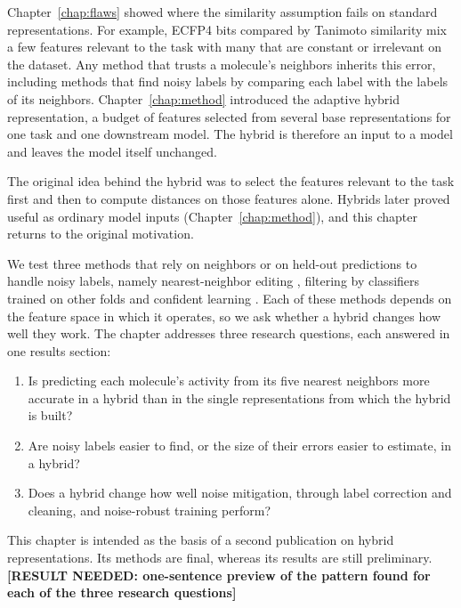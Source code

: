 Chapter~\ref{chap:flaws} showed where the similarity assumption fails on standard representations. For example, ECFP4 bits compared by Tanimoto similarity mix a few features relevant to the task with many that are constant or irrelevant on the dataset. Any method that trusts a molecule's neighbors inherits this error, including methods that find noisy labels by comparing each label with the labels of its neighbors. Chapter~\ref{chap:method} introduced the adaptive hybrid representation, a budget of features selected from several base representations for one task and one downstream model. The hybrid is therefore an input to a model and leaves the model itself unchanged.

The original idea behind the hybrid was to select the features relevant to the task first and then to compute distances on those features alone. Hybrids later proved useful as ordinary model inputs (Chapter~\ref{chap:method}), and this chapter returns to the original motivation.

We test three methods that rely on neighbors or on held-out predictions to handle noisy labels, namely nearest-neighbor editing \citep{Wilson1972}, filtering by classifiers trained on other folds \citep{Brodley1999} and confident learning \citep{Northcutt2021}. Each of these methods depends on the feature space in which it operates, so we ask whether a hybrid changes how well they work. The chapter addresses three research questions, each answered in one results section:
\begin{enumerate}
    \item Is predicting each molecule's activity from its five nearest neighbors more accurate in a hybrid than in the single representations from which the hybrid is built?
    \item Are noisy labels easier to find, or the size of their errors easier to estimate, in a hybrid?
    \item Does a hybrid change how well noise mitigation, through label correction and cleaning, and noise-robust training perform?
\end{enumerate}

This chapter is intended as the basis of a second publication on hybrid representations. Its methods are final, whereas its results are still preliminary. \textbf{[RESULT NEEDED: one-sentence preview of the pattern found for each of the three research questions]}



